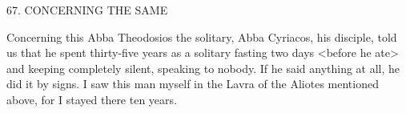 67.
CONCERNING THE SAME

Concerning this Abba Theodosios the solitary, Abba Cyriacos, his
disciple, told us that he spent thirty-five years as a solitary fasting
two days <before he ate> and keeping completely silent, speaking
to nobody.
If he said anything at all, he did it by signs.
I saw this
man myself in the Lavra of the Aliotes mentioned above, for I
stayed there ten years.


